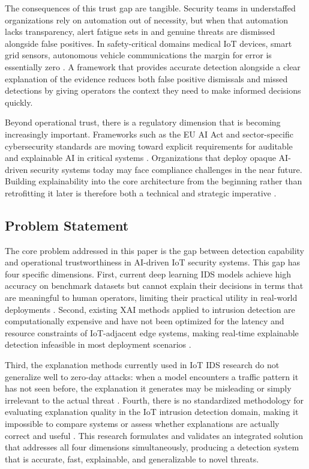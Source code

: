 \documentclass[a4paper,fleqn]{cas-dc}
\numberwithin{equation}{section}
\begin{document}
The consequences of this trust gap are tangible. Security teams in understaffed organizations rely on automation out of necessity, but when that automation lacks transparency, alert fatigue sets in and genuine threats are dismissed alongside false positives. In safety-critical domains medical IoT devices, smart grid sensors, autonomous vehicle communications the margin for error is essentially zero \cite{judith2023efficient, zolanvari2021transparent}. A framework that provides accurate detection alongside a clear explanation of the evidence reduces both false positive dismissals and missed detections by giving operators the context they need to make informed decisions quickly.

Beyond operational trust, there is a regulatory dimension that is becoming increasingly important. Frameworks such as the EU AI Act and sector-specific cybersecurity standards are moving toward explicit requirements for auditable and explainable AI in critical systems \cite{mdpi2025industry5}. Organizations that deploy opaque AI-driven security systems today may face compliance challenges in the near future. Building explainability into the core architecture from the beginning rather than retrofitting it later is therefore both a technical and strategic imperative \cite{anthony2025designing, ijcrt2025threat}.

\subsection{Problem Statement}

The core problem addressed in this paper is the gap between detection capability and operational trustworthiness in AI-driven IoT security systems. This gap has four specific dimensions. First, current deep learning IDS models achieve high accuracy on benchmark datasets but cannot explain their decisions in terms that are meaningful to human operators, limiting their practical utility in real-world deployments \cite{nguyen2022explainable, das2023trustworthy}. Second, existing XAI methods applied to intrusion detection are computationally expensive and have not been optimized for the latency and resource constraints of IoT-adjacent edge systems, making real-time explainable detection infeasible in most deployment scenarios \cite{saheed2022explainable, chen2022explainable}.

Third, the explanation methods currently used in IoT IDS research do not generalize well to zero-day attacks: when a model encounters a traffic pattern it has not seen before, the explanation it generates may be misleading or simply irrelevant to the actual threat \cite{aspg2025zeroday, islam2023robust}. Fourth, there is no standardized methodology for evaluating explanation quality in the IoT intrusion detection domain, making it impossible to compare systems or assess whether explanations are actually correct and useful \cite{frontiers2025ids, jes2024iot}. This research formulates and validates an integrated solution that addresses all four dimensions simultaneously, producing a detection system that is accurate, fast, explainable, and generalizable to novel threats.
\end{document}
